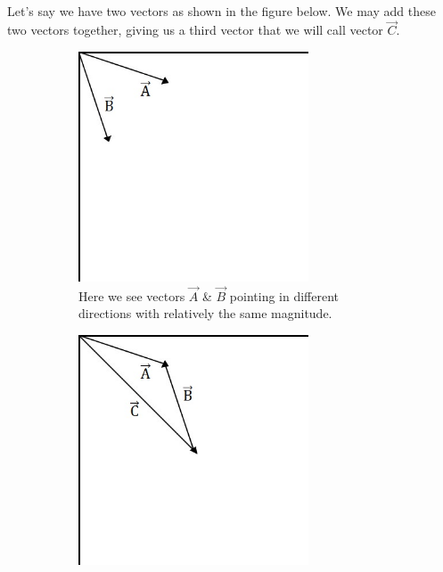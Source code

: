 \documentclass[12pt, letterpaper]{report}
\begin{document}
		\paragraph{} Let's say we have two vectors as shown in the figure below. We may add these two vectors together, giving us a third vector that we will call vector $\vec{C}$.\vspace{-\baselineskip}
		\begin{figure}[h]
			\centering
			\begin{subfigure}{0.5\textwidth}
			\centering
			\includegraphics[width=0.75\textwidth]{Processing Images/VectorAddition/Two Vectors.jpg}
			\caption{Here we see vectors $\vec{A}$ \& $\vec{B}$ pointing in different directions with relatively the same magnitude.}
			\end{subfigure}\hspace{0.15cm}
			\begin{subfigure}{0.45\textwidth}
			\vspace{2.5\baselineskip}
			\centering
			\includegraphics[width=0.75\textwidth]{Processing Images/VectorAddition/VectorAddition.jpg}

\end{subfigure}
\end{figure}
\end{document}
